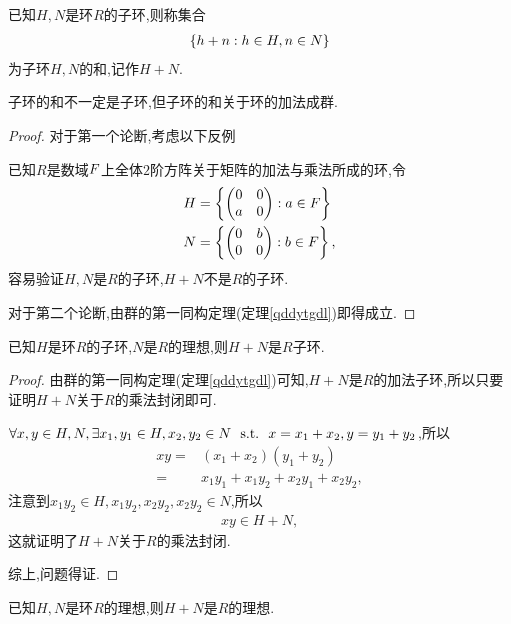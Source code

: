 \begin{definition}[子环的和]
    已知$H,N$是环$R$的子环,则称集合\begin{align*}
        \left\{h+n:h\in H,n\in N\right\}
    \end{align*}为子环$H,N$的和,记作$H+N$.
\end{definition}
\begin{proposition}
    子环的和不一定是子环,但子环的和关于环的加法成群.
\end{proposition}
\begin{proof}
    对于第一个论断,考虑以下反例\begin{*example}
        已知$R$是数域$\relax{F}$上全体$2$阶方阵关于矩阵的加法与乘法所成的环,令\begin{align*}
            &H=\left\{\left(\begin{matrix}
                0&0\\
                a&0
            \end{matrix}\right):a\in\relax{F}\right\}\\
            &N=\left\{\left(\begin{matrix}
                0&b\\
                0&0
            \end{matrix}\right):b\in\relax{F}\right\},
        \end{align*}容易验证$H,N$是$R$的子环,$H+N$不是$R$的子环.
    \end{*example}
    对于第二个论断,由群的第一同构定理(定理\ref{qddytgdl})即得成立.
\end{proof}
\begin{proposition}
    已知$H$是环$R$的子环,$N$是$R$的理想,则$H+N$是$R$子环.
\end{proposition}
\begin{proof}
    由群的第一同构定理(定理\ref{qddytgdl})可知,$H+N$是$R$的加法子环,所以只要证明$H+N$关于$R$的乘法封闭即可.

    $\forall x,y\in H,N,\exists x_1,y_1\in H,x_2,y_2\in N\ \ \mathrm{s.t.}\ \  x=x_1+x_2,y=y_1+y_2$,所以\begin{align*}
        xy=&(x_1+x_2)(y_1+y_2)\\
        =&x_1y_1+x_1y_2+x_2y_1+x_2y_2,
    \end{align*}注意到$x_1y_2\in H,x_1y_2,x_2y_2,x_2y_2\in N$,所以\begin{align*}
        xy\in H+N,
    \end{align*}这就证明了$H+N$关于$R$的乘法封闭.

    综上,问题得证.
\end{proof}
\begin{proposition}
    已知$H,N$是环$R$的理想,则$H+N$是$R$的理想.
\end{proposition}
